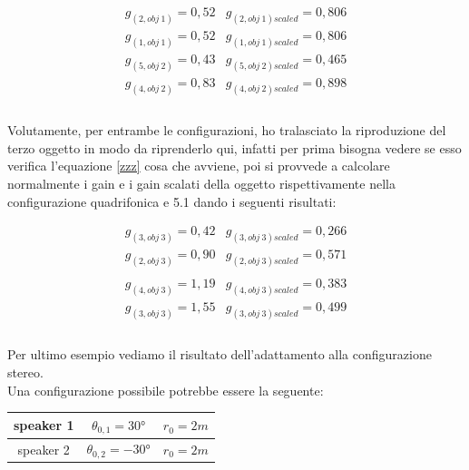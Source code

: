 \documentclass[12pt,a4paper]{report}
\begin{document}
\begin{equation}
\begin{matrix}
g_{(2,obj\ 1)} = 0,52 & g_{(2,obj\ 1)scaled} = 0,806\\ 
g_{(1,obj\ 1)} = 0,52 & g_{(1,obj\ 1)scaled} = 0,806\\
g_{(5,obj\ 2)} = 0,43 & g_{(5,obj\ 2)scaled} = 0,465\\
g_{(4,obj\ 2)} = 0,83 & g_{(4,obj\ 2)scaled} = 0,898  \\
 
\end{matrix} 
\label{gscalatiesempio2}
\end{equation} \\



Volutamente, per entrambe le configurazioni, ho tralasciato la riproduzione del terzo oggetto in modo da riprenderlo qui, infatti per prima bisogna vedere se esso verifica l'equazione \ref{zzz} cosa che avviene, poi si provvede a calcolare normalmente i gain e i gain scalati della oggetto rispettivamente nella configurazione quadrifonica e 5.1 dando i seguenti risultati:

\begin{equation}
\begin{matrix}
g_{(3,obj\ 3)} = 0,42 & g_{(3,obj\ 3)scaled} = 0,266\\ 
g_{(2,obj\ 3)} = 0,90 & g_{(2,obj\ 3)scaled} = 0,571\\ 
\\
g_{(4,obj\ 3)} = 1,19 & g_{(4,obj\ 3)scaled} = 0,383\\
g_{(3,obj\ 3)} = 1,55 & g_{(3,obj\ 3)scaled} = 0,499\\
 
\end{matrix} 
\label{gscalatiesempiooggetto3}
\end{equation} \\



Per ultimo esempio vediamo il risultato dell'adattamento alla configurazione stereo.\\

Una configurazione possibile potrebbe essere la seguente:\\

\begin{tabular}{|c|c|c|}
\hline 
speaker 1 & $\theta_{0,1}=30°$ & $r_0=2m$\\ 
\hline 
speaker 2 & $\theta_{0,2}=-30°$ & $r_0=2m$\\ 
\hline 
\end{tabular} \\
\\
\end{document}
